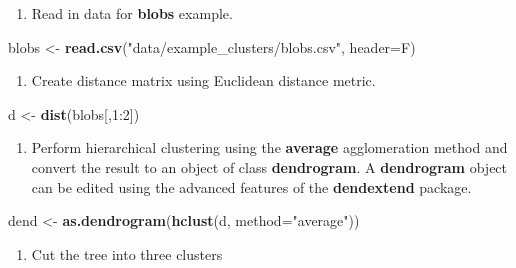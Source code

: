 \documentclass[]{book}
\newenvironment{Shaded}{\begin{snugshade}}{\end{snugshade}}
\newcommand{\KeywordTok}[1]{\textcolor[rgb]{0.13,0.29,0.53}{\textbf{{#1}}}}
\newcommand{\DataTypeTok}[1]{\textcolor[rgb]{0.13,0.29,0.53}{{#1}}}
\newcommand{\DecValTok}[1]{\textcolor[rgb]{0.00,0.00,0.81}{{#1}}}
\newcommand{\StringTok}[1]{\textcolor[rgb]{0.31,0.60,0.02}{{#1}}}
\newcommand{\NormalTok}[1]{{#1}}
\providecommand{\tightlist}{%
  \setlength{\itemsep}{0pt}\setlength{\parskip}{0pt}}
\theoremstyle{definition}
\theoremstyle{definition}
\theoremstyle{definition}
\theoremstyle{remark}
\begin{document}
\begin{enumerate}
\def\labelenumi{\arabic{enumi}.}
\setcounter{enumi}{2}
\tightlist
\item
  Read in data for \textbf{blobs} example.
\end{enumerate}

\begin{Shaded}
\begin{Highlighting}[]
\NormalTok{blobs <-}\StringTok{ }\KeywordTok{read.csv}\NormalTok{(}\StringTok{"data/example_clusters/blobs.csv"}\NormalTok{, }\DataTypeTok{header=}\NormalTok{F)}
\end{Highlighting}
\end{Shaded}

\begin{enumerate}
\def\labelenumi{\arabic{enumi}.}
\setcounter{enumi}{3}
\tightlist
\item
  Create distance matrix using Euclidean distance metric.
\end{enumerate}

\begin{Shaded}
\begin{Highlighting}[]
\NormalTok{d <-}\StringTok{ }\KeywordTok{dist}\NormalTok{(blobs[,}\DecValTok{1}\NormalTok{:}\DecValTok{2}\NormalTok{])}
\end{Highlighting}
\end{Shaded}

\begin{enumerate}
\def\labelenumi{\arabic{enumi}.}
\setcounter{enumi}{4}
\tightlist
\item
  Perform hierarchical clustering using the \textbf{average}
  agglomeration method and convert the result to an object of class
  \textbf{dendrogram}. A \textbf{dendrogram} object can be edited using
  the advanced features of the \textbf{dendextend} package.
\end{enumerate}

\begin{Shaded}
\begin{Highlighting}[]
\NormalTok{dend <-}\StringTok{ }\KeywordTok{as.dendrogram}\NormalTok{(}\KeywordTok{hclust}\NormalTok{(d, }\DataTypeTok{method=}\StringTok{"average"}\NormalTok{))}
\end{Highlighting}
\end{Shaded}

\begin{enumerate}
\def\labelenumi{\arabic{enumi}.}
\setcounter{enumi}{5}
\tightlist
\item
  Cut the tree into three clusters
\end{enumerate}
\end{document}
